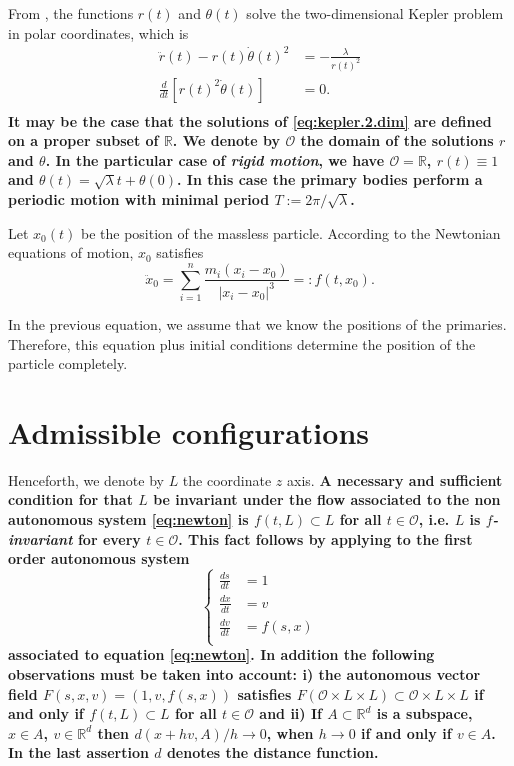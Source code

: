 \documentclass[smallcondensed]{svjour3}
\newcommand{\rr}{\mathbb{R}}
\begin{document}
From \cite[Eq. (2.16)]{JaumeLlibre276},  the functions $r(t)$ and $\theta (t)$ solve the two-dimensional Kepler problem in polar coordinates, which is 
\begin{equation}
 \begin{array}{rl}\label{eq:kepler.2.dim}
\ddot{r}(t)-r(t)\dot{\theta}(t)^2 & = -\frac{\lambda}{r(t)^2}\\
\frac{d }{dt}\left[ r(t)^2\dot{\theta}(t)\right] & =0.\\
\end{array}
\end{equation}
\textbf{It may be the case that the solutions of \eqref{eq:kepler.2.dim} are defined on a proper subset of $\rr$. We denote  by $\mathcal{O}$ the domain of the solutions $r$ and $\theta$. In the particular case of \emph{rigid motion}, we have $\mathcal{O}=\rr$,  $r(t)\equiv 1$ and $\theta (t)=\sqrt{\lambda }t +\theta(0)$. In this case the primary bodies perform a periodic motion with minimal period $T:=2\pi/\sqrt{\lambda }$. }

Let $x_0(t)$ be the position of the massless particle.
According to the Newtonian equations of motion, $x_0$ satisfies
\begin{equation}\label{eq:newton}
 \ddot{x}_0=\sum_{i=1}^n\frac{m_i(x_i-x_0)}{|x_i-x_0|^3}=:f(t,x_0).
\end{equation}

In the previous equation, we assume that we know the positions of the primaries. Therefore, this equation plus  initial conditions  determine the position of the particle completely.


\section{Admissible configurations}\label{sec:admisible.configuraciones}
Henceforth, we denote by $L$ the coordinate $z$ axis.
\textbf{
 A necessary and sufficient condition for that $L$  be invariant under the  flow associated to the non autonomous system  \eqref{eq:newton} is  $f(t,L)\subset L$ for all $t\in\mathcal{O}$, i.e. $L$ is \emph{$f$-invariant} for every $t\in\mathcal{O}$. This fact follows by applying \cite[Th. 1]{Hai-1970} to the first order autonomous system
}
\[
 \left\{
  \begin{array}{cc}
   \frac{ds}{dt}&=1\\
   \frac{dx}{dt}&=v\\
   \frac{dv}{dt}&=f(s,x)\\
  \end{array}
 \right.
\]
\textbf{associated to equation  \eqref{eq:newton}. In addition the following observations must be taken into account: i) the autonomous vector field $F(s,x,v)=(1,v,f(s,x))$ satisfies $F(\mathcal{O}\times L\times L)\subset \mathcal{O}\times L\times L$ if and only if $f(t,L)\subset L$ for all $t\in\mathcal{O}$ and ii) If $A\subset \rr^d$ is a subspace,  $x\in A$, $v\in\rr^d$ then $d(x+hv,A)/h\to 0$, when $h\to 0$ if and only if $v\in A$. In the last assertion $d$ denotes the distance function.}
\end{document}
